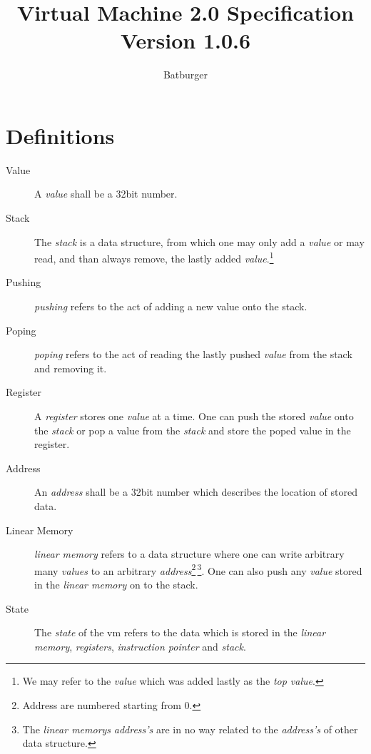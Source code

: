 \documentclass[10pt,a4paper]{article}
\author{Batburger}
\title{Virtual Machine 2.0 Specification \\ \small Version 1.0.6}
\begin{document}
	\tt
	
	\maketitle
	\section{Definitions}
	\label{definitions}
	\begin{description}
		\item[Value] A \textit{value} shall be a 32bit number.
		
		\item[Stack] The \textit{stack} is a data structure, from which one may only add a \textit{value} or may read, and than always remove, the lastly added \textit{value}.\footnote{We may refer to the \textit{value} which was added lastly as the \textit{top value}.} 

		\item[Pushing] \textit{pushing} refers to the act of adding a new value onto the stack.
		
		\item[Poping] \textit{poping} refers to the act of reading the lastly pushed	 \textit{value} from the stack and removing it.

		\item[Register] A \textit{register} stores one \textit{value} at a time. One can push the stored \textit{value} onto the \textit{stack} or pop a value from the \textit{stack} and store the poped value in the register.
		
		\item[Address] An \textit{address} shall be a 32bit number which describes the location of stored data.  		
		
		\item[Linear Memory] \textit{linear memory} refers to a data structure where one can write arbitrary many \textit{values} to an arbitrary \textit{address}\footnote{Address are numbered starting from 0.}\,\footnote{The \textit{linear memorys} \textit{address's} are in no way related to the \textit{address's} of other data structure.}. One can also push any \textit{value} stored in the \textit{linear memory} on to the stack.
		
		\item[State] The \textit{state} of the vm refers to the data which is stored in the \textit{linear memory}, \textit{registers}, \textit{instruction pointer} and \textit{stack}.		
		

\end{description}
\end{document}
